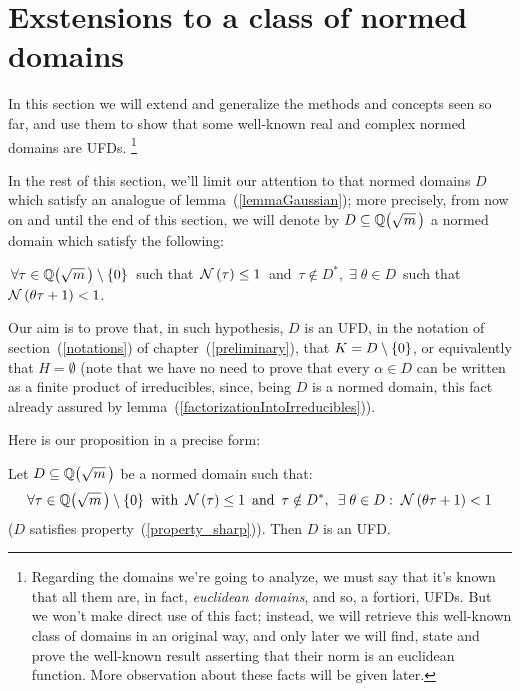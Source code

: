 \section{Exstensions to a class of normed domains}\label{ext}

In this section we will extend and generalize the methods and
concepts seen so far, and use them to show that some well-known
real and complex normed domains are UFDs.%
\footnote{Regarding the domains we're going to analyze, we must
say that it's known that all them are, in fact,\/
\emph{euclidean domains\/}, and so, a fortiori, UFDs.
But we won't make direct use of this fact; instead, we will retrieve
this well-known class of domains in an original way, and only later
we will find, state and prove the well-known result asserting that
their norm is an euclidean function. More observation about these
facts will be given later.}

\medskip
In the rest of this section, we'll limit our attention to that normed
domains $D$ which satisfy an analogue of lemma~(\ref{lemmaGaussian});
more precisely, from now on and until the end of this section, we will
denote by $D \subseteq \QQ{m}$ a normed domain which satisfy the
following:

\begin{property}\label{property_sharp} 
$\,\forall \tau \in \QQ{m}\minz$\,
such that\, $\mathcal{N}\left(\tau\right) \leq 1$\,
and\, $\tau \notin D^\ast,\; \exists\; \theta \in D$
\,such that\, $\mathcal{N}\left(\theta\tau + 1\right) < 1$.
\end{property}

Our aim is to prove that, in such hypothesis, $D$
is an UFD, \ie in the notation of section~(\ref{notations})
of chapter~(\ref{preliminary}), that $K = D\setminus\left\{0\right\}$,
or equivalently that $H = \emptyset$ (note that we have no
need to prove that every $\alpha \in D$ can be written as a
finite product of irreducibles, since, being $D$ is a normed
domain, this fact already assured by
lemma~(\ref{factorizationIntoIrreducibles})).

Here is our proposition in a precise form:

\begin{thm}\label{property_sharp_implies_UFD}
Let $D \subseteq \QQ{m}$ be a normed domain such that:
$$
\forall \tau \in \QQ{m}\minz \text{ with }\, \Norm{\tau} \leq 1
\textrm{ \,and\, }
\tau \notin D^\ast,\ \, \exists\; \theta \in D:\;
 \Norm{\theta\tau + 1} < 1
$$
(\ie $D$ satisfies property~(\ref{property_sharp})).
Then $D$ is an UFD.
\end{thm}

